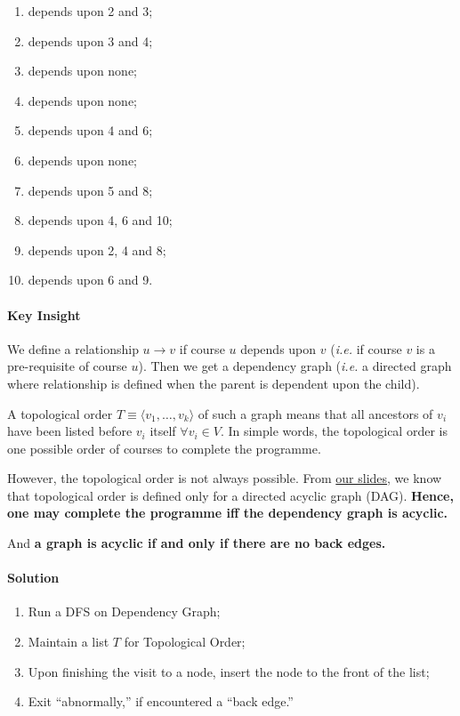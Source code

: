 \documentclass[11pt]{article}
\begin{document}
\begin{enumerate}
\item depends upon 2 and 3;
\item depends upon 3 and 4;
\item depends upon none;
\item depends upon none;
\item depends upon 4 and 6;
\item depends upon none;
\item depends upon 5 and 8;
\item depends upon 4, 6 and 10;
\item depends upon 2, 4 and 8;
\item depends upon 6 and 9.
\end{enumerate}

\paragraph*{Key Insight}
\label{sec:orgd5236bb}
We define a relationship \(u\to v\) if course \(u\) depends
upon \(v\) (\emph{i.e.} if course \(v\) is a pre-requisite of
course \(u\)).  Then we get a dependency graph (\emph{i.e.} a
directed graph where relationship is defined when the
parent is dependent upon the child).

A topological order \(T\equiv\langle v_{1},\ldots,v_{k}
\rangle\) of such a graph means that all ancestors of
\(v_{i}\) have been listed before \(v_{i}\) itself \(\forall
v_{i}\in V\).  In simple words, the topological order is
one possible order of courses to complete the
programme.

However, the topological order is not always possible.
From \href{https://docs.google.com/presentation/d/14PY-Sc50QsFxdUqZk7GlYVwwEXzO38rg9z9KKx5ti0k/edit\#slide=id.g32a7028b731\_0\_377}{our slides}, we know that topological order is
defined only for a directed acyclic graph (DAG).
\textbf{Hence, one may complete the programme iff the
dependency graph is acyclic.}

And \textbf{a graph is acyclic if and only if there are no
back edges.}

\paragraph*{Solution}
\label{sec:org4d08a6b}
\begin{enumerate}
\item Run a DFS on Dependency Graph;
\item Maintain a list \(T\) for Topological Order;
\item Upon finishing the visit to a node, insert the node
to the front of the list;
\item Exit “abnormally,” if encountered a “back edge.”
\end{enumerate}
\end{document}
